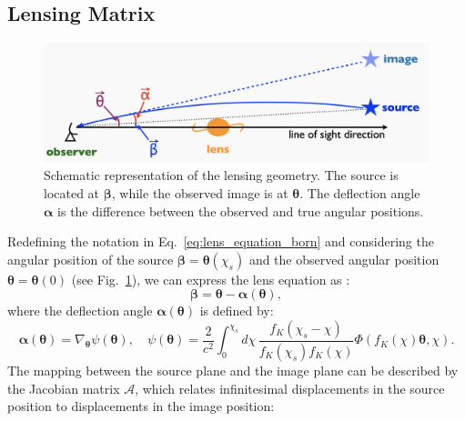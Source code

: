 \subsection{Lensing Matrix}
\begin{figure}[ht]
    \centering
    \includegraphics[width=\textwidth]{figures/Lens_overview_Oguri.png}
    \caption[Schematic representation of the lensing geometry]{Schematic representation of the lensing geometry. The source is located at $\boldsymbol{\beta}$, while the observed image is at $\boldsymbol{\theta}$. The deflection angle $\boldsymbol{\alpha}$ is the difference between the observed and true angular positions.}
    \label{fig:lens_geometry}
\end{figure}
Redefining the notation in Eq.~\eqref{eq:lens_equation_born} and considering the angular position of the source $\boldsymbol{\beta} = \boldsymbol{\theta}(\chi_s)$ and the observed angular position $\boldsymbol{\theta} = \boldsymbol{\theta}(0)$ (see Fig.~\ref{fig:lens_geometry}), we can express the lens equation as \citep{2001PhR...340..291B, 2009A&A...499...31H, 2015RPPh...78h6901K}:
\begin{equation}
    \boldsymbol{\beta} = \boldsymbol{\theta} - \boldsymbol{\alpha}(\boldsymbol{\theta}),
    \label{eq:lens_equation_vector}
\end{equation}
where the deflection angle \( \boldsymbol{\alpha}(\boldsymbol{\theta}) \) is defined by:
\begin{equation}
    \boldsymbol{\alpha}(\boldsymbol{\theta}) = \nabla_{\boldsymbol{\theta}} \psi(\boldsymbol{\theta}), \quad \psi(\boldsymbol{\theta}) = \frac{2}{c^2} \int_0^{\chi_s} d\chi \, \frac{f_K(\chi_s - \chi)}{f_K(\chi_s)f_K(\chi)} \Phi\left(f_K(\chi) \boldsymbol{\theta}, \chi\right).
    \label{eq:deflection_angle}
\end{equation}
The mapping between the source plane and the image plane can be described by the Jacobian matrix $\mathcal{A}$, which relates infinitesimal displacements in the source position to displacements in the image position:
